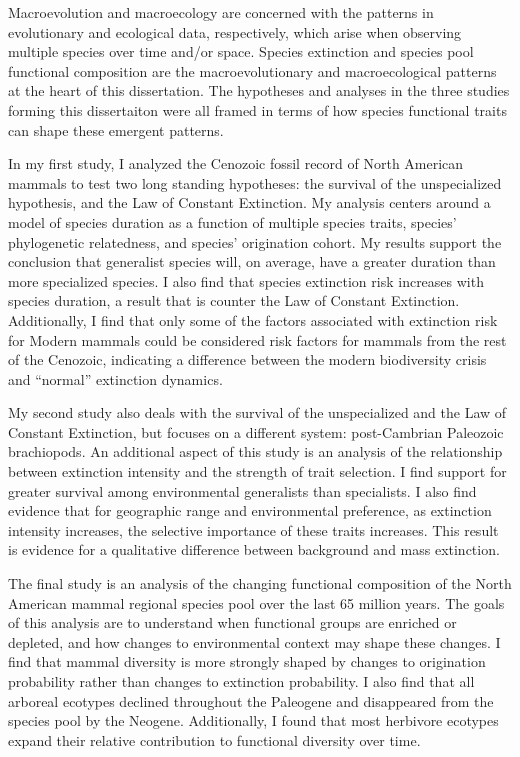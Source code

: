 \abstract

Macroevolution and macroecology are concerned with the patterns in evolutionary and ecological data, respectively, which arise when observing multiple species over time and/or space. Species extinction and species pool functional composition are the macroevolutionary and macroecological patterns at the heart of this dissertation. The hypotheses and analyses in the three studies forming this dissertaiton were all framed in terms of how species functional traits can shape these emergent patterns. 

In my first study, I analyzed the Cenozoic fossil record of North American mammals to test two long standing hypotheses: the survival of the unspecialized hypothesis, and the Law of Constant Extinction. My analysis centers around a model of species duration as a function of multiple species traits, species' phylogenetic relatedness, and species' origination cohort. My results support the conclusion that generalist species will, on average, have a greater duration than more specialized species. I also find that species extinction risk increases with species duration, a result that is counter the Law of Constant Extinction. Additionally, I find that only some of the factors associated with extinction risk for Modern mammals could be considered risk factors for mammals from the rest of the Cenozoic, indicating a difference between the modern biodiversity crisis and ``normal'' extinction dynamics.

My second study also deals with the survival of the unspecialized and the Law of Constant Extinction, but focuses on a different system: post-Cambrian Paleozoic brachiopods. An additional aspect of this study is an analysis of the relationship between extinction intensity and the strength of trait selection. I find support for greater survival among environmental generalists than specialists. I also find evidence that for geographic range and environmental preference, as extinction intensity increases, the selective importance of these traits increases. This result is evidence for a qualitative difference between background and mass extinction.

The final study is an analysis of the changing functional composition of the North American mammal regional species pool over the last 65 million years. The goals of this analysis are to understand when functional groups are enriched or depleted, and how changes to environmental context may shape these changes. I find that mammal diversity is more strongly shaped by changes to origination probability rather than changes to extinction probability. I also find that all arboreal ecotypes declined throughout the Paleogene and disappeared from the species pool by the Neogene. Additionally, I found that most herbivore ecotypes expand their relative contribution to functional diversity over time.

